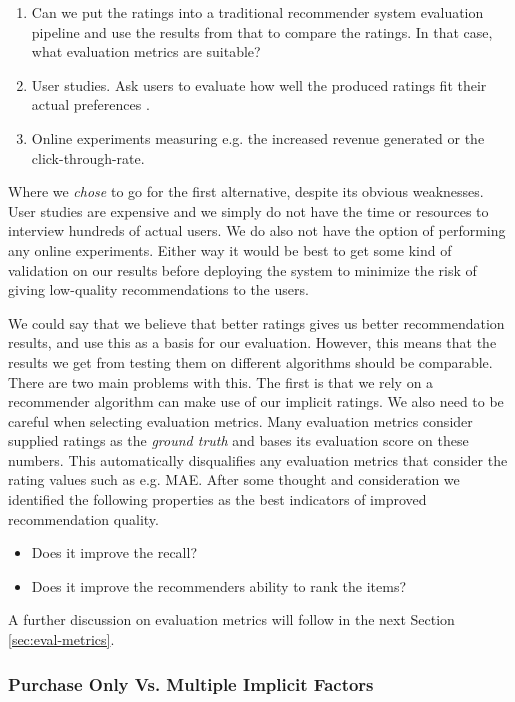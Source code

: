 \begin{enumerate}
\item Can we put the ratings into a traditional recommender system evaluation pipeline and use the
	  results from that to compare the ratings. In that case, what evaluation metrics are suitable?
\item User studies. Ask users to evaluate how well the produced ratings fit their actual preferences \cite{parra2011walk}.
\item Online experiments measuring e.g. the increased revenue generated or the click-through-rate.
\end{enumerate}

Where we \emph{chose} to go for the first alternative, despite its obvious weaknesses. User studies
are expensive and we simply do not have the time or resources to interview hundreds of actual users.
We do also not have the option of performing any online experiments. Either way it would be best to
get some kind of validation on our results before deploying the system to minimize the risk of giving
low-quality recommendations to the users.

We could say that we believe that better ratings gives us better recommendation results, and use this
as a basis for our evaluation. However, this means that the results we get from testing them
on different algorithms should be comparable. There are two main problems with this. The first is that
we rely on a recommender algorithm can make use of our implicit ratings. We also need to be careful
when selecting evaluation metrics. Many evaluation metrics consider supplied ratings as the \emph{ground truth}
and bases its evaluation score on these numbers. This automatically disqualifies any evaluation metrics
that consider the rating values such as e.g. MAE. After some thought and consideration
we identified the following properties as the best indicators of improved recommendation quality.

\begin{itemize}
\item Does it improve the recall?
\item Does it improve the recommenders ability to rank the items?
\end{itemize}

A further discussion on evaluation metrics will follow in the next Section \ref{sec:eval-metrics}.

\subsubsection{Purchase Only Vs. Multiple Implicit Factors}

